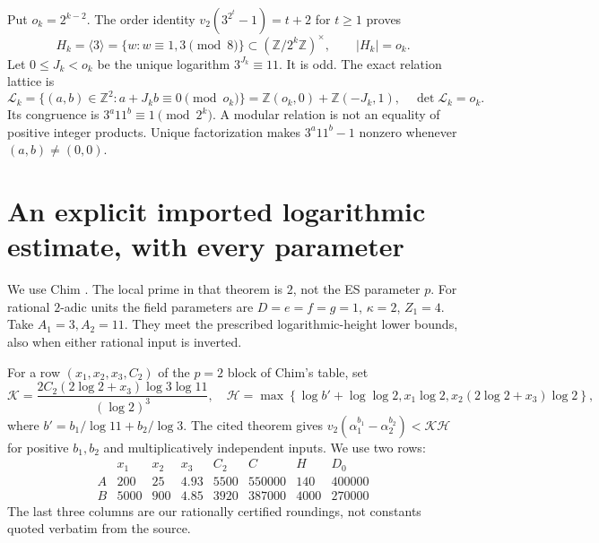 Put $o_k=2^{k-2}$. The order identity
$v_2(3^{2^t}-1)=t+2$ for $t\ge1$ proves
\[
 H_k=\langle3\rangle=\{w:w\equiv1,3\pmod8\}
 \subset(\mathbb Z/2^k\mathbb Z)^\times,\qquad |H_k|=o_k.
\]
Let $0\le J_k<o_k$ be the unique logarithm $3^{J_k}\equiv11$.
It is odd. The exact relation lattice is
\[
 \mathcal L_k=\{(a,b)\in\mathbb Z^2:a+J_kb\equiv0\pmod{o_k}\}
 =\mathbb Z(o_k,0)+\mathbb Z(-J_k,1),\quad\det\mathcal L_k=o_k.
                                                               \tag{A5}
\]
Its congruence is $3^a11^b\equiv1\pmod{2^k}$. A modular relation is not
an equality of positive integer products. Unique factorization makes
$3^a11^b-1$ nonzero whenever $(a,b)\ne(0,0)$.

\section{An explicit imported logarithmic estimate, with every parameter}
We use Chim \cite[Theorem 2.1; \S10, Table 1 and final formula on
pp.~346--348]{Chim}. The local prime in that theorem is $2$, not the ES
parameter $p$. For rational $2$-adic units the field parameters are
$D=e=f=g=1$, $\kappa=2$, $Z_1=4$. Take $A_1=3,A_2=11$.
They meet the prescribed logarithmic-height lower bounds, also when either
rational input is inverted.

For a row $(x_1,x_2,x_3,C_2)$ of the $p=2$ block of Chim's table, set
\[
 \mathcal K=\frac{2C_2(2\log2+x_3)\log3\log11}{(\log2)^3},\quad
 \mathcal H=\max\!\left\{\log b'+\log\log2,
 x_1\log2,x_2(2\log2+x_3)\log2\right\},
\]
where $b'=b_1/\log11+b_2/\log3$. The cited theorem gives
$v_2(\alpha_1^{b_1}-\alpha_2^{b_2})<\mathcal K\mathcal H$ for
positive $b_1,b_2$ and multiplicatively independent inputs. We use two rows:
\[
\begin{array}{c|rrrr|rrr}
 &x_1&x_2&x_3&C_2&C&H&D_0\\\hline
 A&200&25&4.93&5500&550000&140&400000\\
 B&5000&900&4.85&3920&387000&4000&270000
\end{array}                                                   \tag{B1}
\]
The last three columns are our rationally certified roundings, not constants
quoted verbatim from the source.

